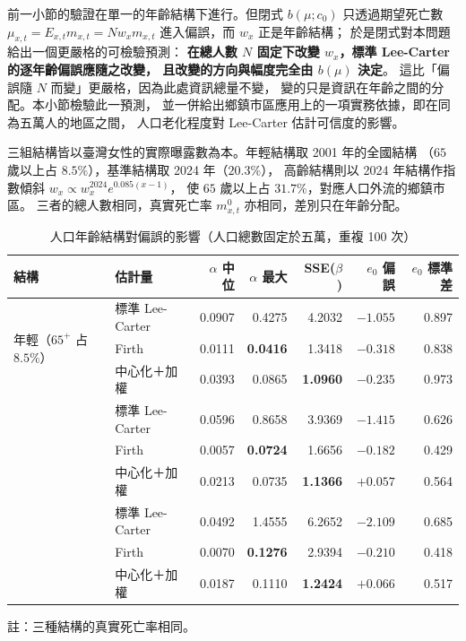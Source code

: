 \documentclass[UTF8, fontset=macnew, a4paper, 12pt]{ctexart}
\begin{document}
前一小節的驗證在單一的年齡結構下進行。但閉式 $b(\mu;c_0)$ 只透過期望死亡數
$\mu_{x,t}=E_{x,t}m_{x,t}=N w_x m_{x,t}$ 進入偏誤，而 $w_x$ 正是年齡結構；
於是閉式對本問題給出一個更嚴格的可檢驗預測：
\textbf{在總人數 $N$ 固定下改變 $w_x$，標準 Lee-Carter 的逐年齡偏誤應隨之改變，
且改變的方向與幅度完全由 $b(\mu)$ 決定}。
這比「偏誤隨 $N$ 而變」更嚴格，因為此處資訊總量不變，
變的只是資訊在年齡之間的分配。本小節檢驗此一預測，
並一併給出鄉鎮市區應用上的一項實務依據，即在同為五萬人的地區之間，
人口老化程度對 Lee-Carter 估計可信度的影響。

三組結構皆以臺灣女性的實際曝露數為本。年輕結構取 2001 年的全國結構
（$65$ 歲以上占 $8.5\%$），基準結構取 2024 年（$20.3\%$），
高齡結構則以 2024 年結構作指數傾斜 $w_x\propto w_x^{2024}e^{0.085(x-1)}$，
使 $65$ 歲以上占 $31.7\%$，對應人口外流的鄉鎮市區。
三者的總人數相同，真實死亡率 $m^{0}_{x,t}$ 亦相同，差別只在年齡分配。

\begin{table}[H]
\centering
\caption{人口年齡結構對偏誤的影響（人口總數固定於五萬，重複 100 次）}
\small
\renewcommand{\arraystretch}{1.15}
\begin{tabular}{llrrrrr}
\toprule
結構 & 估計量 & $\alpha$ 中位 & $\alpha$ 最大 & SSE($\beta$) & $e_0$ 偏誤 & $e_0$ 標準差\\
\midrule
\multirow{3}{*}{年輕（$65^{+}$ 占 $8.5\%$）}
 & 標準 Lee-Carter      & 0.0907 & 0.4275 & 4.2032 & $-1.055$ & 0.897\\
 & Firth        & 0.0111 & \textbf{0.0416} & 1.3418 & $-0.318$ & 0.838\\
 & 中心化＋加權 & 0.0393 & 0.0865 & \textbf{1.0960} & \textbf{$-0.235$} & 0.973\\
\addlinespace
\multirow{3}{*}{基準（$20.3\%$）}
 & 標準 Lee-Carter      & 0.0596 & 0.8658 & 3.9369 & $-1.415$ & 0.626\\
 & Firth        & 0.0057 & \textbf{0.0724} & 1.6656 & $-0.182$ & 0.429\\
 & 中心化＋加權 & 0.0213 & 0.0735 & \textbf{1.1366} & \textbf{$+0.057$} & 0.564\\
\addlinespace
\multirow{3}{*}{高齡（$31.7\%$）}
 & 標準 Lee-Carter      & 0.0492 & 1.4555 & 6.2652 & $-2.109$ & 0.685\\
 & Firth        & 0.0070 & \textbf{0.1276} & 2.9394 & $-0.210$ & 0.418\\
 & 中心化＋加權 & 0.0187 & 0.1110 & \textbf{1.2424} & \textbf{$+0.066$} & 0.517\\
\bottomrule
\end{tabular}

{\footnotesize 註：三種結構的真實死亡率相同。}

\label{tab:popstr}
\end{table}
\end{document}
